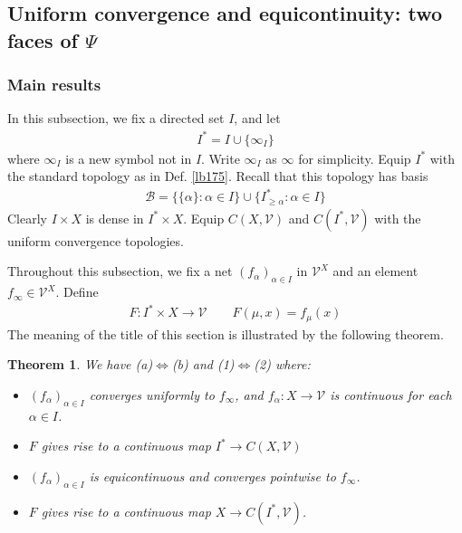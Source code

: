 \documentclass[12pt,b5paper,notitlepage]{article}
\theoremstyle{definition}
\theoremstyle{plain}
\newtheorem{thm}[df]{Theorem}
\newcommand{\mc}{\mathcal}
\numberwithin{equation}{section}
\begin{document}
\subsection{Uniform convergence and equicontinuity: two faces of $\Psi$}\label{lb306}



\subsubsection{Main results}\label{lb282}

In this subsection, we fix a directed set $I$, and let
\begin{align*}
I^*=I\cup\{\infty_I\}
\end{align*}
where $\infty_I$ is a new symbol not in $I$. Write $\infty_I$ as $\infty$ for simplicity. Equip $I^*$ with the standard topology as in Def. \ref{lb175}. Recall that this topology has basis
\begin{align*}
\mc B=\big\{\{\alpha\}:\alpha\in I \big\}\cup \big\{I^*_{\geq\alpha}:\alpha\in I \big\}
\end{align*}
Clearly $I\times X$ is dense in $I^*\times X$. Equip $C(X,\mc V)$ and $C(I^*,\mc V)$ with the uniform convergence topologies.

Throughout this subsection, we fix a net $(f_\alpha)_{\alpha\in I}$ in $\mc V^X$ and an element $f_\infty\in\mc V^X$. Define
\begin{align}
F:I^*\times X\rightarrow\mc V\qquad F(\mu,x)=f_\mu(x)  \label{eq88}
\end{align} 
The meaning of the title of this section is illustrated by the following theorem.





\begin{thm}\label{lb280}
We have (a)$\Leftrightarrow$(b) and (1)$\Leftrightarrow$(2)  where:
\begin{itemize}
\item[(a)] $(f_\alpha)_{\alpha\in I}$ converges uniformly to $f_\infty$, and $f_\alpha:X\rightarrow\mc V$ is continuous for each $\alpha\in I$.
\item[(b)] $F$ gives rise to a continuous map $I^*\rightarrow C(X,\mc V)$
\item[(1)] $(f_\alpha)_{\alpha\in I}$ is equicontinuous and converges pointwise to $f_\infty$.
\item[(2)] $F$ gives rise to a continuous map $X\rightarrow C(I^*,\mc V)$.
\end{itemize}
\end{thm}
\end{document}

